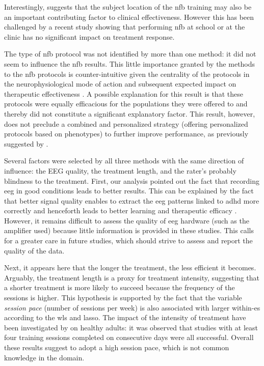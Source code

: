 Interestingly, \citep{Minder2018} suggests that the subject location of the \gls{nfb} training may also be an important contributing 
factor to clinical effectiveness. However this has been challenged by a recent study \citep{Minder2018} showing that 
performing \gls{nfb} at school or at the clinic has no significant impact on treatment response. 

The type of \gls{nfb} protocol was not identified by more than one method: it did not seem to influence the \gls{nfb} results. 
This little importance granted by the methods to the \gls{nfb} protocols is counter-intuitive given the centrality of the 
protocols in the neurophysiological mode of action and subsequent expected impact on
therapeutic effectiveness \citep{Vernon2004}. A possible explanation for this result is that these protocols were equally 
efficacious for the populations they were offered to and thereby did not constitute a significant explanatory factor. 
This result, however, does not preclude a combined and personalized strategy (offering personalized protocols based on phenotypes)
to further improve performance, as previously suggested by \citet{Alkoby2017}.

Several factors were selected by all three methods with the same direction of influence: the EEG quality, the treatment 
length, and the rater's probably blindness to the treatment. First, our analysis pointed out the fact that recording \gls{eeg} 
in good conditions leads to better results.
This can be explained by the fact that better signal quality enables to extract the \gls{eeg} patterns
linked to \gls{adhd} more correctly and henceforth leads to better learning and therapeutic efficacy \citep{Congedo2004}. 
However, it remains difficult to assess the quality of \gls{eeg} hardware (such as the amplifier used) 
because little information is provided in these studies.  
This calls for a greater care in future studies, which should strive to assess and report the quality of the data.

Next, it appears here that the longer the treatment, the less efficient it becomes. Arguably, the treatment length is a
proxy for treatment intensity, suggesting that a shorter treatment is more likely to succeed because the frequency of the sessions
is higher. This hypothesis is supported by the fact that the variable \emph{session pace} (number of
sessions per week) is also associated with larger within-\gls{es} according to the \gls{wls} and \gls{lasso}. The impact of the
intensity of treatment have been investigated by \citep{Rogala2016} on healthy adults: it was observed that studies with
at least four training sessions completed on consecutive days were all successful. Overall these results suggest to adopt a high session pace, 
which is not common knowledge in the domain.

